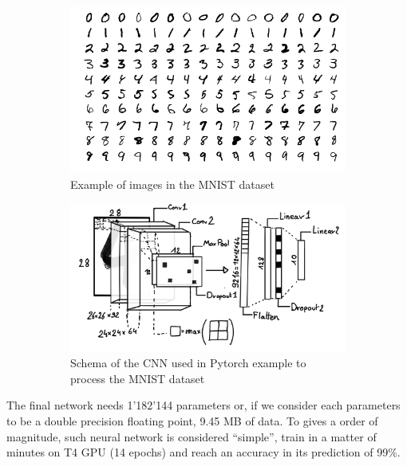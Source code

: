 \documentclass[../main.tex]{subfiles}
\begin{document}
\begin{figure}[ht]
  \centering
  \begin{subfigure}[t]{0.48\linewidth}
    \includegraphics[width=\linewidth]{images/ml/MnistExamples.png}
    \caption{Example of images in the MNIST dataset}
    \label{fig:ml:mnist}
  \end{subfigure}
  \hfill
  \begin{subfigure}[t]{0.48\linewidth}
    \includegraphics[width=\linewidth]{images/ml/mnist_cnn.jpg}
    \caption{Schema of the CNN used in Pytorch example to process the MNIST dataset}
    \label{fig:ml:cnn_mnist}
  \end{subfigure}
  \caption{}
\end{figure}

The final network needs 1'182'144 parameters or, if we consider each parameters to be a double precision floating point, 9.45 MB of data. To gives a order of magnitude, such neural network is considered ``simple'', train in a matter of minutes on T4 GPU \cite{noauthor_nvidia_nodate} (14 epochs) and reach an accuracy in its prediction of 99\%.
\end{document}
